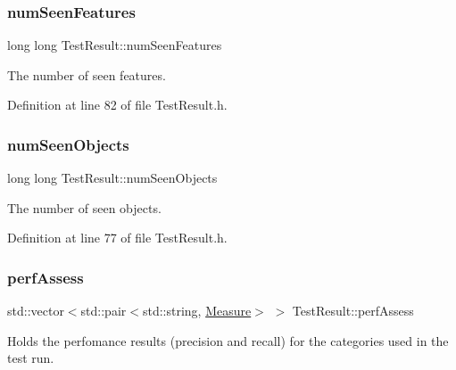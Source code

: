 \mbox{\label{class_test_result_a3908b36b2834082b11fdbb3932a4908e}} 
\subsubsection{\texorpdfstring{num\+Seen\+Features}{numSeenFeatures}}
{\footnotesize\ttfamily long long Test\+Result\+::num\+Seen\+Features\hspace{0.3cm}{\ttfamily [protected]}}

The number of seen features. 

Definition at line 82 of file Test\+Result.\+h.

\mbox{\label{class_test_result_a5e10d3944bd5a8f6997547fb2faf4de6}} 
\subsubsection{\texorpdfstring{num\+Seen\+Objects}{numSeenObjects}}
{\footnotesize\ttfamily long long Test\+Result\+::num\+Seen\+Objects\hspace{0.3cm}{\ttfamily [protected]}}

The number of seen objects. 

Definition at line 77 of file Test\+Result.\+h.

\mbox{\label{class_test_result_a7d451af5c02d15b3b8d117adbcdede57}} 
\subsubsection{\texorpdfstring{perf\+Assess}{perfAssess}}
{\footnotesize\ttfamily std\+::vector$<$std\+::pair$<$std\+::string, \hyperlink{class_measure}{Measure}$>$ $>$ Test\+Result\+::perf\+Assess\hspace{0.3cm}{\ttfamily [protected]}}

Holds the perfomance results (precision and recall) for the categories used in the test run. 


